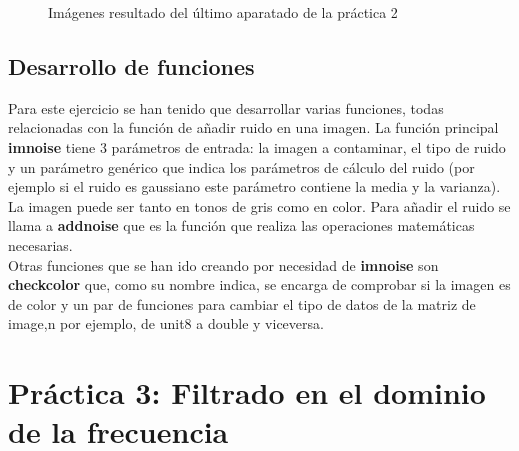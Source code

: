 \documentclass[a4paper,12pt]{report}
\begin{document}
\begin{figure}[!tbp]
  \centering
  \hfill
  \caption{Imágenes resultado del último aparatado de la práctica 2}
  \label{p2final}
\end{figure}


\subsection{Desarrollo de funciones}

Para este ejercicio se han tenido que desarrollar varias funciones, todas relacionadas con la función de añadir ruido en una imagen. La función principal \textbf{imnoise} tiene 3 parámetros de entrada: la imagen a contaminar, el tipo de ruido y un parámetro genérico que indica los parámetros de cálculo del ruido (por ejemplo si el ruido es gaussiano este parámetro contiene la media y la varianza). La imagen puede ser tanto en tonos de gris como en color. Para añadir el ruido se llama a \textbf{addnoise} que es la función que realiza las operaciones matemáticas necesarias.\\

Otras funciones que se han ido creando por necesidad de \textbf{imnoise} son \textbf{checkcolor} que, como su nombre indica, se encarga de comprobar si la imagen es de color y un par de funciones para cambiar el tipo de datos de la matriz de image,n por ejemplo, de unit8 a double y viceversa.

\section{Práctica 3: Filtrado en el dominio de la frecuencia}
\end{document}
